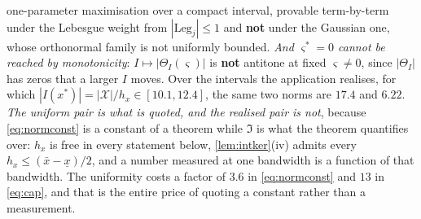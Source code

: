 one-parameter maximisation over a compact interval, provable term-by-term under the Lebesgue weight from
$|\mathrm{Leg}_j|\le1$ and \textbf{not} under the Gaussian one, whose orthonormal family is not
uniformly bounded. \emph{And $\varsigma^\ast=0$ cannot be reached by monotonicity}: $I\mapsto
|\Theta_I(\varsigma)|$ is \textbf{not} antitone at fixed $\varsigma\ne0$, since $|\Theta_I|$ has zeros
that a larger $I$ moves. Over the intervals the application realises, for which
$|I(x^\ast)|=|\mathcal X|/h_x\in[10.1,12.4]$, the same two norms are $17.4$ and $6.22$. \emph{The
uniform pair is what is quoted, and the realised pair is not}, because \eqref{eq:normconst} is a
constant of a theorem while $\mathfrak I$ is what the theorem quantifies over: $h_x$ is free in every
statement below, \cref{lem:intker}\textup{(iv)} admits every $h_x\le(\bar x-\underline x)/2$, and a
number measured at one bandwidth is a function of that bandwidth. The uniformity costs a factor of
$3.6$ in \eqref{eq:normconst} and $13$ in \eqref{eq:cap}, and that is the entire price of quoting a
constant rather than a measurement.

